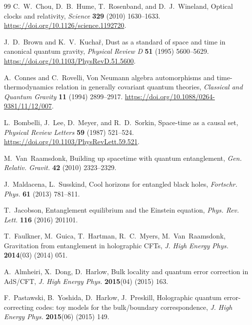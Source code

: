 \documentclass[11pt]{article}
\theoremstyle{definition}
\begin{document}
\begin{thebibliography}{99}
C.~W.~Chou, D.~B.~Hume, T.~Rosenband, and D.~J.~Wineland, Optical clocks and
relativity, \emph{Science} \textbf{329} (2010) 1630--1633.
\url{https://doi.org/10.1126/science.1192720}.

J.~D.~Brown and K.~V.~Kucha\v{r}, Dust as a standard of space and time in
canonical quantum gravity, \emph{Physical Review D} \textbf{51} (1995)
5600--5629.
\url{https://doi.org/10.1103/PhysRevD.51.5600}.

A.~Connes and C.~Rovelli, Von Neumann algebra automorphisms and
time-thermodynamics relation in generally covariant quantum theories,
\emph{Classical and Quantum Gravity} \textbf{11} (1994) 2899--2917.
\url{https://doi.org/10.1088/0264-9381/11/12/007}.

L.~Bombelli, J.~Lee, D.~Meyer, and R.~D.~Sorkin, Space-time as a causal set,
\emph{Physical Review Letters} \textbf{59} (1987) 521--524.
\url{https://doi.org/10.1103/PhysRevLett.59.521}.


M.~Van~Raamsdonk, Building up spacetime with quantum entanglement,
\emph{Gen. Relativ. Gravit.} \textbf{42} (2010) 2323--2329.

J.~Maldacena, L.~Susskind, Cool horizons for entangled black holes,
\emph{Fortschr. Phys.} \textbf{61} (2013) 781--811.

T.~Jacobson, Entanglement equilibrium and the Einstein equation,
\emph{Phys. Rev. Lett.} \textbf{116} (2016) 201101.

T.~Faulkner, M.~Guica, T.~Hartman, R.~C.~Myers, M.~Van~Raamsdonk, Gravitation from
entanglement in holographic CFTs, \emph{J. High Energy Phys.} \textbf{2014}(03)
(2014) 051.

A.~Almheiri, X.~Dong, D.~Harlow, Bulk locality and quantum error correction in
AdS/CFT, \emph{J. High Energy Phys.} \textbf{2015}(04) (2015) 163.

F.~Pastawski, B.~Yoshida, D.~Harlow, J.~Preskill, Holographic quantum
error-correcting codes: toy models for the bulk/boundary correspondence,
\emph{J. High Energy Phys.} \textbf{2015}(06) (2015) 149.


\end{thebibliography}
\end{document}
